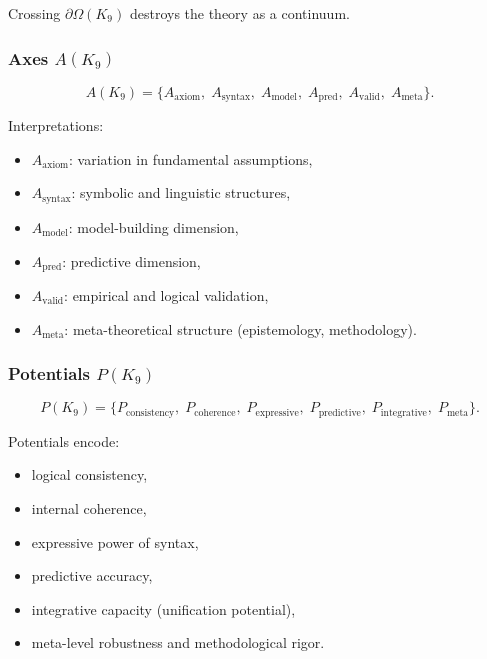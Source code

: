 Crossing $\partial\Omega(K_9)$ destroys the theory as a continuum.

\subsubsection{Axes \texorpdfstring{$A(K_9)$}{A(K_9)}}

\[
A(K_9)=
\{
A_{\mathrm{axiom}},\;
A_{\mathrm{syntax}},\;
A_{\mathrm{model}},\;
A_{\mathrm{pred}},\;
A_{\mathrm{valid}},\;
A_{\mathrm{meta}}
\}.
\]

Interpretations:
\begin{itemize}
    \item $A_{\mathrm{axiom}}$: variation in fundamental assumptions,
    \item $A_{\mathrm{syntax}}$: symbolic and linguistic structures,
    \item $A_{\mathrm{model}}$: model-building dimension,
    \item $A_{\mathrm{pred}}$: predictive dimension,
    \item $A_{\mathrm{valid}}$: empirical and logical validation,
    \item $A_{\mathrm{meta}}$: meta-theoretical structure (epistemology, methodology).
\end{itemize}

\subsubsection{Potentials \texorpdfstring{$P(K_9)$}{P(K_9)}}

\[
P(K_9)=
\{
P_{\mathrm{consistency}},\;
P_{\mathrm{coherence}},\;
P_{\mathrm{expressive}},\;
P_{\mathrm{predictive}},\;
P_{\mathrm{integrative}},\;
P_{\mathrm{meta}}
\}.
\]

Potentials encode:
\begin{itemize}
    \item logical consistency,
    \item internal coherence,
    \item expressive power of syntax,
    \item predictive accuracy,
    \item integrative capacity (unification potential),
    \item meta-level robustness and methodological rigor.
\end{itemize}

